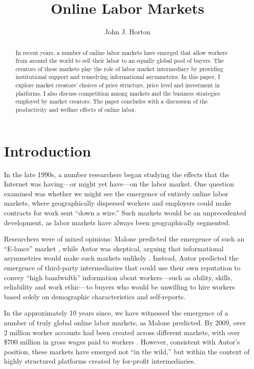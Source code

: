 \documentclass{llncs}
\begin{document}
\title{Online Labor Markets} 
\author{John J. Horton} 
\maketitle

\begin{abstract} 
In recent years, a number of online labor markets have emerged that
allow workers from around the world to sell their labor to an equally
global pool of buyers. The creators of these markets play the role of
labor market intermediary by providing institutional support and
remedying informational asymmetries. In this paper, I explore
market creators' choices of price structure, price level and
investment in platforms. I also discuss competition among
markets and the business strategies employed by market creators. The paper
concludes with a discussion of the productivity and welfare effects of
online labor.
\end{abstract}

\section{Introduction} 
In the late 1990s, a number researchers began studying the effects
that the Internet was having---or might yet have---on the labor
market.  One question examined was whether we might see the emergence of
entirely online labor markets, where geographically dispersed workers
and employers could make contracts for work sent ``down
a wire.'' Such markets would be an unprecedented
development, as labor markets have always been geographically
segmented. 

Researchers were of mixed opinions: Malone predicted the
emergence of such an ``E-lance'' market \cite{malone1998}, while Autor
was skeptical, arguing that informational asymmetries would make such
markets unlikely \cite{autor2000wlm}. Instead, Autor predicted the
emergence of third-party intermediaries that could use their own
reputation to convey ``high bandwidth'' information about
workers---such as ability, skills, reliability and work ethic---to
buyers who would be unwilling to hire workers based solely on
demographic characteristics and self-reports.

In the approximately 10 years since, we have witnessed the
emergence of a number of truly global online labor markets, as Malone
predicted. By 2009, over 2 million worker accounts had been
created across different markets, with over \$700 million in gross wages paid to workers \cite{frei2009}. However, consistent
with Autor's position, these markets have emerged not ``in the wild,''
but within the context of highly structured platforms created by
for-profit intermediaries.
\end{document}
